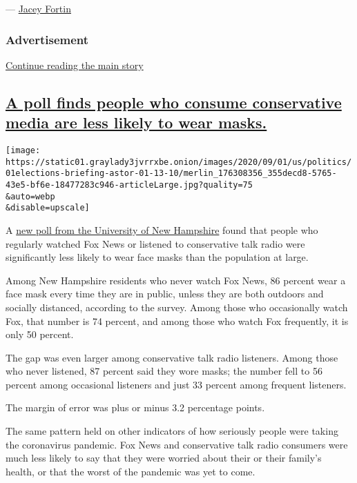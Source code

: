 --- \href{https://www.nytimes3xbfgragh.onion/by/jacey-fortin}{Jacey
Fortin}

\hypertarget{advertisement-3}{%
\subsubsection{Advertisement}\label{advertisement-3}}

\protect\hyperlink{after-dfp-ad-mid4}{Continue reading the main story}

\hypertarget{a-poll-finds-people-who-consume-conservative-media-are-less-likely-to-wear-masks}{%
\subsection{\texorpdfstring{\protect\hyperlink{a-poll-finds-people-who-consume-conservative-media-are-less-likely-to-wear-masks}{A
poll finds people who consume conservative media are less likely to wear
masks.}}{A poll finds people who consume conservative media are less likely to wear masks.}}\label{a-poll-finds-people-who-consume-conservative-media-are-less-likely-to-wear-masks}}

\texttt{[image: https://static01.graylady3jvrrxbe.onion/images/2020/09/01/us/politics/01elections-briefing-astor-01-13-10/merlin\_176308356\_355decd8-5765-43e5-bf6e-18477283c946-articleLarge.jpg?quality=75\\\&auto=webp\\\&disable=upscale]}

A
\href{https://carsey.unh.edu/publication/conservative-media-consumers-views-COVID-19}{new
poll from the University of New Hampshire} found that people who
regularly watched Fox News or listened to conservative talk radio were
significantly less likely to wear face masks than the population at
large.

Among New Hampshire residents who never watch Fox News, 86 percent wear
a face mask every time they are in public, unless they are both outdoors
and socially distanced, according to the survey. Among those who
occasionally watch Fox, that number is 74 percent, and among those who
watch Fox frequently, it is only 50 percent.

The gap was even larger among conservative talk radio listeners. Among
those who never listened, 87 percent said they wore masks; the number
fell to 56 percent among occasional listeners and just 33 percent among
frequent listeners.

The margin of error was plus or minus 3.2 percentage points.

The same pattern held on other indicators of how seriously people were
taking the coronavirus pandemic. Fox News and conservative talk radio
consumers were much less likely to say that they were worried about
their or their family's health, or that the worst of the pandemic was
yet to come.

